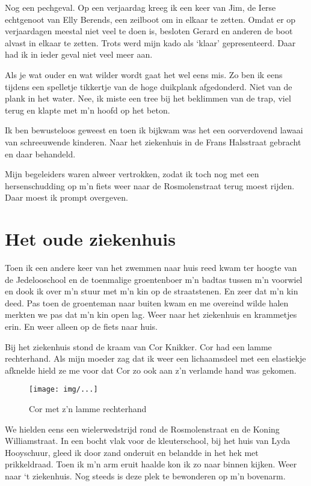\documentclass[10pt,twoside,openright]{memoir}
\begin{document}
Nog een pechgeval. Op een verjaardag kreeg ik een keer van Jim, de Ierse echtgenoot van Elly Berends, een zeilboot om in elkaar te zetten. Omdat er op verjaardagen meestal niet veel te doen is, besloten Gerard en anderen de boot alvast in elkaar te zetten. Trots werd mijn kado als ‘klaar’ gepresenteerd. Daar had ik in ieder geval niet veel meer aan.

Als je wat ouder en wat wilder wordt gaat het wel eens mis. Zo ben ik eens tijdens een spelletje tikkertje van de hoge duikplank afgedonderd. Niet van de plank in het water. Nee, ik miste een tree bij het beklimmen van de trap, viel terug en klapte met m’n hoofd op het beton. 

Ik ben bewusteloos geweest en toen ik bijkwam was het een oorverdovend lawaai van schreeuwende kinderen. Naar het ziekenhuis in de Frans Halsstraat gebracht en daar behandeld.

Mijn begeleiders waren alweer vertrokken, zodat ik toch nog met een hersenschudding op m’n fiets weer naar de Rosmolenstraat terug moest rijden. Daar moest ik prompt overgeven. 

\chapter{Het oude ziekenhuis} %
\label{cha:ziekenhuis}

Toen ik een andere keer van het zwemmen naar huis reed kwam ter hoogte van de Jedelooschool en de toenmalige groentenboer m’n badtas tussen m’n voorwiel en dook ik over m’n stuur met m’n kin op de straatstenen. En zeer dat m’n kin deed. Pas toen de groenteman naar buiten kwam en me overeind wilde halen merkten we pas dat m’n kin open lag. Weer naar het ziekenhuis en krammetjes erin. En weer alleen op de fiets naar huis.

Bij het ziekenhuis stond de kraam van Cor Knikker. Cor had een lamme rechterhand. Als mijn moeder zag dat ik weer een lichaamsdeel met een elastiekje afknelde hield ze me voor dat Cor zo ook aan z’n verlamde hand was gekomen.

\begin{figure}[t]
\texttt{[image: img/...]}
\caption{Cor met z'n lamme rechterhand}
\end{figure}

We hielden eens een wielerwedstrijd rond de Rosmolenstraat en de Koning Williamstraat. In een bocht vlak voor de kleuterschool, bij het huis van Lyda Hooyschuur, gleed ik door zand onderuit en belandde in het hek met prikkeldraad. Toen ik m’n arm eruit haalde kon ik zo naar binnen kijken. Weer naar ‘t ziekenhuis. Nog steeds is deze plek te bewonderen op m’n bovenarm. 
\end{document}

